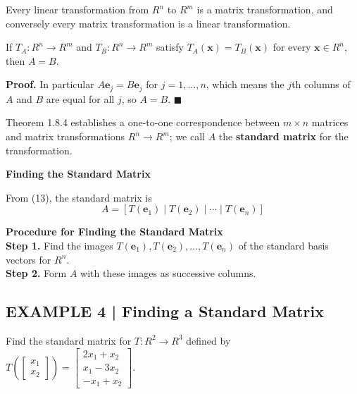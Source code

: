 \documentclass{article}
\newcommand{\redheading}[1]{{\vspace{2mm}\noindent\Large\bfseries\color{red!55!black} #1\par}\vspace{2mm}}
\theoremstyle{mystyle}
\begin{document}
\begin{tcolorbox}[colback=red!4, colframe=red!60!black, title=Theorem 1.8.3, boxrule=0.5mm, arc=3mm]
Every linear transformation from $R^n$ to $R^m$ is a matrix transformation, and conversely every matrix transformation is a linear transformation.
\end{tcolorbox}

\begin{tcolorbox}[colback=red!4, colframe=red!60!black, title=Theorem 1.8.4, boxrule=0.5mm, arc=3mm]
If $T_A:R^n\to R^m$ and $T_B:R^n\to R^m$ satisfy $T_A(\mathbf{x})=T_B(\mathbf{x})$ for every $\mathbf{x}\in R^n$, then $A=B$.
\end{tcolorbox}
\textbf{Proof.} In particular $A\mathbf{e}_j=B\mathbf{e}_j$ for $j=1,\ldots,n$, which means the $j$th columns of $A$ and $B$ are equal for all $j$, so $A=B$. $\blacksquare$

Theorem 1.8.4 establishes a one-to-one correspondence between $m\times n$ matrices and matrix transformations $R^n\to R^m$; we call $A$ the \textbf{standard matrix} for the transformation.

\redheading{Finding the Standard Matrix}

From (13), the standard matrix is
\[
A=[T(\mathbf{e}_1)\mid T(\mathbf{e}_2)\mid\cdots\mid T(\mathbf{e}_n)] \tag{15}
\]

\begin{tcolorbox}[colback=blue!5, colframe=blue!60!black, boxrule=0.5mm, arc=3mm]
\textbf{Procedure for Finding the Standard Matrix}\\
\textbf{Step 1.} Find the images $T(\mathbf{e}_1), T(\mathbf{e}_2),\ldots,T(\mathbf{e}_n)$ of the standard basis vectors for $R^n$.\\
\textbf{Step 2.} Form $A$ with these images as successive columns.
\end{tcolorbox}

\subsection*{EXAMPLE 4 | Finding a Standard Matrix}
Find the standard matrix for $T:R^2\to R^3$ defined by
$T\!\left(\begin{bmatrix}x_1\\x_2\end{bmatrix}\right)=\begin{bmatrix}2x_1+x_2\\x_1-3x_2\\-x_1+x_2\end{bmatrix}$.
\end{document}
